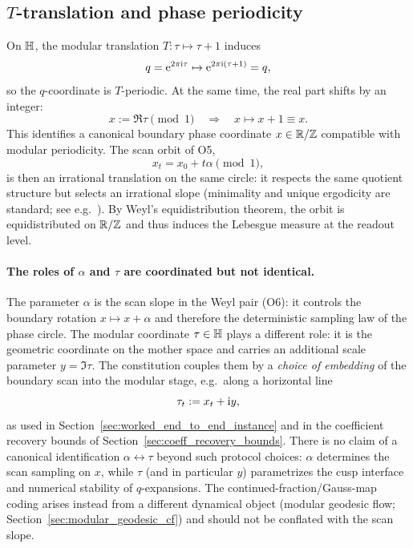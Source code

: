 \subsection{\texorpdfstring{$T$}{T}-translation and phase periodicity}
\label{sec:T_translation}

On $\mathbb{H}$, the modular translation $T:\tau\mapsto\tau+1$ induces
\begin{equation}
q = \mathrm{e}^{2\pi \mathrm{i} \tau} \mapsto \mathrm{e}^{2\pi \mathrm{i} (\tau+1)} = q,
\end{equation}
so the $q$-coordinate is $T$-periodic. At the same time, the real part shifts by an integer:
\begin{equation}
x := \Re\tau \pmod 1 \quad \Rightarrow \quad x \mapsto x+1 \equiv x.
\end{equation}
This identifies a canonical boundary phase coordinate $x\in\mathbb{R}/\mathbb{Z}$ compatible with modular periodicity. The scan orbit of O5,
\begin{equation}
x_t = x_0 + t\alpha \pmod 1,
\end{equation}
is then an irrational translation on the same circle: it respects the same quotient structure but selects an irrational slope (minimality and unique ergodicity are standard; see e.g.\ \cite{Weyl1916,KatokHasselblatt1995}).
By Weyl's equidistribution theorem, the orbit is equidistributed on $\mathbb{R}/\mathbb{Z}$ and thus induces the Lebesgue measure at the readout level.

\paragraph{The roles of \texorpdfstring{$\alpha$}{alpha} and \texorpdfstring{$\tau$}{tau} are coordinated but not identical.}
The parameter $\alpha$ is the scan slope in the Weyl pair (O6): it controls the boundary rotation $x\mapsto x+\alpha$ and therefore the deterministic sampling law of the phase circle.
The modular coordinate $\tau\in\mathbb{H}$ plays a different role: it is the geometric coordinate on the mother space and carries an additional scale parameter $y=\Im\tau$.
The constitution couples them by a \emph{choice of embedding} of the boundary scan into the modular stage, e.g.\ along a horizontal line
\begin{equation}
\tau_t := x_t+\mathrm{i} y,
\end{equation}
as used in Section~\ref{sec:worked_end_to_end_instance} and in the coefficient recovery bounds of Section~\ref{sec:coeff_recovery_bounds}.
There is no claim of a canonical identification $\alpha\leftrightarrow\tau$ beyond such protocol choices: $\alpha$ determines the scan sampling on $x$, while $\tau$ (and in particular $y$) parametrizes the cusp interface and numerical stability of $q$-expansions.
The continued-fraction/Gauss-map coding arises instead from a different dynamical object (modular geodesic flow; Section~\ref{sec:modular_geodesic_cf}) and should not be conflated with the scan slope.


